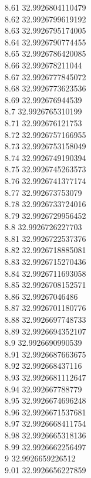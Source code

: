 {8.61	32.9926804110479\\
8.62	32.9926799619192\\
8.63	32.9926795174005\\
8.64	32.9926790774455\\
8.65	32.9926786420085\\
8.66	32.992678211044\\
8.67	32.9926777845072\\
8.68	32.9926773623536\\
8.69	32.992676944539\\
8.7	32.9926765310199\\
8.71	32.992676121753\\
8.72	32.9926757166955\\
8.73	32.9926753158049\\
8.74	32.9926749190394\\
8.75	32.9926745263573\\
8.76	32.9926741377174\\
8.77	32.992673753079\\
8.78	32.9926733724016\\
8.79	32.9926729956452\\
8.8	32.9926726227703\\
8.81	32.9926722537376\\
8.82	32.9926718885081\\
8.83	32.9926715270436\\
8.84	32.9926711693058\\
8.85	32.9926708152571\\
8.86	32.99267046486\\
8.87	32.9926701180776\\
8.88	32.9926697748733\\
8.89	32.9926694352107\\
8.9	32.9926690990539\\
8.91	32.9926687663675\\
8.92	32.992668437116\\
8.93	32.9926681112647\\
8.94	32.992667788779\\
8.95	32.9926674696248\\
8.96	32.9926671537681\\
8.97	32.9926668411754\\
8.98	32.9926665318136\\
8.99	32.9926662256497\\
9	32.9926659226512\\
9.01	32.9926656227859\\
}
